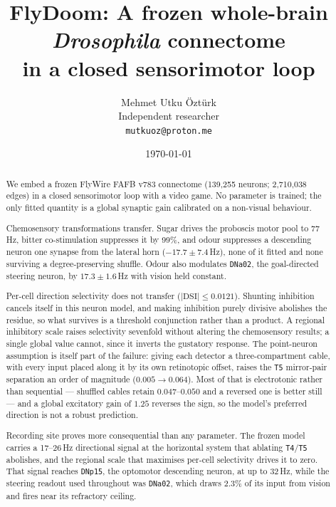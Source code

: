 \documentclass[10pt,twoside]{article}
\title{FlyDoom: A frozen whole-brain \emph{Drosophila} connectome\\[3pt]
in a closed sensorimotor loop}
\author{Mehmet Utku \"Ozt\"urk\\[3pt]
{\normalsize Independent researcher}\\
{\small\texttt{mutkuoz@proton.me}}}
\date{\today}
\makeatletter
\newcommand{\cell}[1]{\texttt{#1}}
\renewcommand{\maketitle}{%
  \thispagestyle{plain}
  \begin{center}
    {\LARGE\bfseries \@title \par}\vspace{1.1em}
    {\large \@author \par}\vspace{0.5em}
    {\small \@date \par}
  \end{center}
  \vspace{0.6em}
}
\makeatother
\begin{document}
\maketitle

\begin{abstract}
\noindent
We embed a frozen FlyWire FAFB v783 connectome (139{,}255 neurons;
2{,}710{,}038 edges) in a closed sensorimotor loop with a video game. No
parameter is trained; the only fitted quantity is a global synaptic gain
calibrated on a non-visual behaviour.

Chemosensory transformations transfer. Sugar drives the proboscis motor pool
to 77\,Hz, bitter co-stimulation suppresses it by 99\%, and odour suppresses a
descending neuron one synapse from the lateral horn ($-17.7\pm7.4$\,Hz), none
of it fitted and none surviving a degree-preserving shuffle. Odour also
modulates \cell{DNa02}, the goal-directed steering neuron, by
$17.3\pm1.6$\,Hz with vision held constant.

Per-cell direction selectivity does not transfer
($|\mathrm{DSI}|\leq0.0121$). Shunting inhibition cancels itself in this neuron
model, and making inhibition purely divisive abolishes the residue, so what
survives is a threshold conjunction rather than a product. A regional
inhibitory scale raises selectivity sevenfold without altering the
chemosensory results; a single global value cannot, since it inverts the
gustatory response. The point-neuron assumption is itself part of the failure:
giving each detector a three-compartment cable, with every input placed along
it by its own retinotopic offset, raises the \cell{T5} mirror-pair separation
an order of magnitude ($0.005\to0.064$). Most of that is electrotonic rather
than sequential --- shuffled cables retain $0.047$--$0.050$ and a reversed one
is better still --- and a global excitatory gain of $1.25$ reverses the sign,
so the model's preferred direction is not a robust prediction.

Recording site proves more consequential than any parameter. The frozen model
carries a 17--26\,Hz directional signal at the horizontal system that ablating
\cell{T4}/\cell{T5} abolishes, and the regional scale that maximises per-cell
selectivity drives it to zero. That signal reaches \cell{DNp15}, the optomotor
descending neuron, at up to 32\,Hz, while the steering readout used throughout
was \cell{DNa02}, which draws $2.3\%$ of its input from vision and fires near
its refractory ceiling.


\end{abstract}
\end{document}
